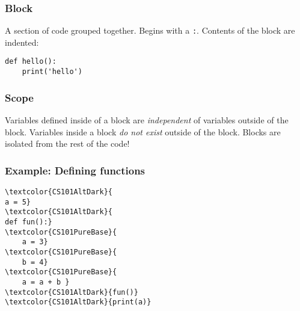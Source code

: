 \documentclass[11pt]{beamer}
\begin{document}
\begin{frame}[fragile]
  \frametitle{Block}
  \Enlarge

  \begin{itemize}
  \myitem  A section of code grouped together. %
  \myitem  Begins with a \texttt{:}. %
  \myitem  Contents of the block are indented:
  \end{itemize}
  \begin{Verbatim}[commandchars=\\\{\},commentchar=\%]
def hello():
    print('hello')
  \end{Verbatim}
\end{frame}

\begin{frame}
  \frametitle{Scope}
  \Enlarge

  \begin{itemize}
  \myitem  Variables defined inside of a block are \emph{independent} of variables outside of the block. %
  \myitem  Variables inside a block \emph{do not exist} outside of the block. %
  \myitem  Blocks are isolated from the rest of the code!
  \end{itemize}
\end{frame}

\begin{frame}[fragile]
  \frametitle{Example:  Defining functions}
  \Enlarge

  \begin{Verbatim}[commandchars=\\\{\},commentchar=\%]
\textcolor{CS101AltDark}{
a = 5}
\textcolor{CS101AltDark}{
def fun():}
\textcolor{CS101PureBase}{
    a = 3}
\textcolor{CS101PureBase}{
    b = 4}
\textcolor{CS101PureBase}{
    a = a + b } 
\textcolor{CS101AltDark}{fun()}
\textcolor{CS101AltDark}{print(a)}
  \end{Verbatim}
\end{frame}
\end{document}
